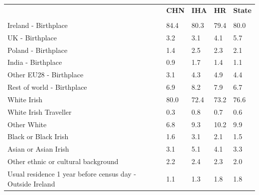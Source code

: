 \documentclass{article}
\begin{document}
\pagebreak
\begin{table}[h]	
\centering
		\begin{tabular}{KTTTT}
  \hline
& \textbf{CHN} & \textbf{IHA} & \textbf{HR}& \textbf{State}\\ 
  \hline
    \\ 
    \hline
Ireland - Birthplace & 84.4& 80.3& 79.4& 80.0\\
UK - Birthplace & 3.2& 3.1& 4.1& 5.7\\
Poland - Birthplace & 1.4& 2.5& 2.3& 2.1\\
India - Birthplace & 0.9& 1.7& 1.4& 1.1\\
Other EU28 - Birthplace & 3.1& 4.3& 4.9& 4.4\\
Rest of world - Birthplace & 6.9& 8.2& 7.9& 6.7\\
    \hline
White Irish & 80.0& 72.4& 73.2& 76.6\\
White Irish Traveller & 0.3& 0.8& 0.7& 0.6\\
Other White &  6.8&  9.3& 10.2&  9.9\\
Black or Black Irish & 1.6& 3.1& 2.1& 1.5\\
Asian or Asian Irish & 3.1& 5.1& 4.1& 3.3\\
Other ethnic or cultural background & 2.2& 2.4& 2.3& 2.0\\
    \hline
Usual residence 1 year before census day - Outside Ireland & 1.1& 1.3& 1.8& 1.8\\


\end{tabular}
\end{table}
\end{document}
